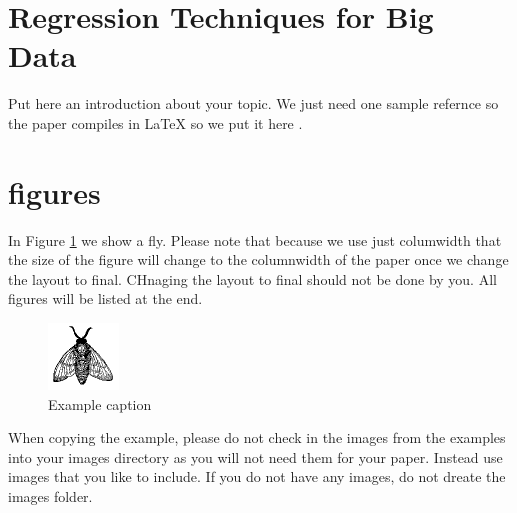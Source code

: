 \documentclass[sigconf]{acmart}
\begin{document}
\section{Regression Techniques for Big Data}

Put here an introduction about your topic. 
We just need one sample refernce so the paper compiles in LaTeX so we
put it here \cite{editor00}.

\section{figures}

In Figure \ref{f:fly} we show a fly. Please note that because we use
just columwidth that the size of the figure will change to the
columnwidth of the paper once we change the layout to final. CHnaging
the layout to final should not be done by you. All figures will be
listed at the end.

\begin{figure}[!ht]
  \centering\includegraphics[width=\columnwidth]{images/fly.pdf}
  \caption{Example caption}\label{f:fly}
\end{figure}

When copying the example, please do not check in the images from the
examples into your images directory as you will not need them for your
paper. Instead use images that you like to include. If you do not have
any images, do not dreate the images folder.
\end{document}
